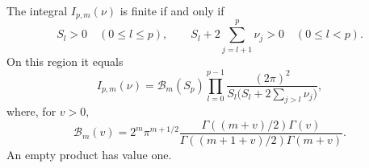\begin{theorem}\label{jk-exact}
The integral \(I_{p,m}(\nu)\) is finite if and only if
\begin{equation}\label{jk-cone}
 S_l>0\quad(0\leq l\leq p),\qquad
 S_l+2\sum_{j=l+1}^{p}\nu_j>0\quad(0\leq l<p).
\end{equation}
On this region it equals
\begin{equation}\label{jk-product}
 I_{p,m}(\nu)=
 \mathcal B_m(S_p)
 \prod_{l=0}^{p-1}
   \frac{(2\pi)^2}{S_l\bigl(S_l+2\sum_{j>l}\nu_j\bigr)},
\end{equation}
where, for \(v>0\),
\begin{equation}\label{jk-base-value}
 \mathcal B_m(v)=
  2^m\pi^{m+1/2}
  \frac{\Gamma((m+v)/2)\Gamma(v)}
       {\Gamma((m+1+v)/2)\Gamma(m+v)} .
\end{equation}
An empty product has value one.
\end{theorem}

